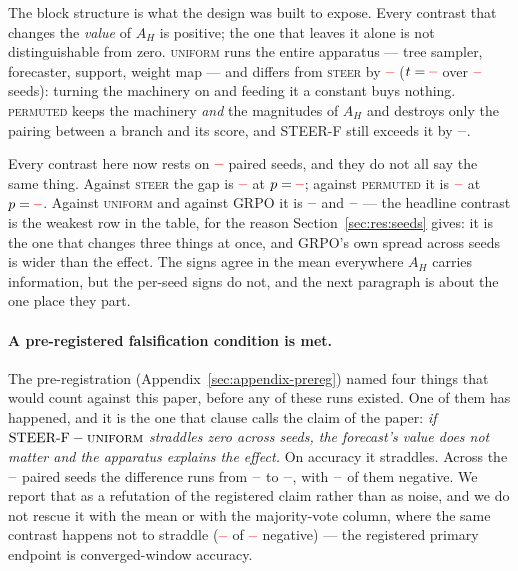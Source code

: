 \documentclass[11pt]{article}
\newcommand{\AH}{A_{H}}
\providecommand{\PENDING}{\textcolor{red}{\textbf{--}}}
\newcommand{\num}[1]{\ifcsname #1\endcsname\csname #1\endcsname\else\PENDING\fi}
\begin{document}
The block structure is what the design was built to expose. Every contrast that
changes the \emph{value} of $\AH$ is positive; the one that leaves it alone is not
distinguishable from zero. \textsc{uniform} runs the entire apparatus --- tree
sampler, forecaster, support, weight map --- and differs from \textsc{steer} by
$\num{Cuniformsteeracc}$ ($t = \num{Tuniformsteeracc}$ over
$\num{Nseedsused}$ seeds): turning the machinery on and feeding it a constant
buys nothing. \textsc{permuted} keeps the machinery \emph{and} the magnitudes of
$\AH$ and destroys only the pairing between a branch and its score, and STEER-F
still exceeds it by $\num{Csignedpermutedacc}$.

Every contrast here now rests on $\num{Nsignedgrpo}$ paired seeds, and they do not
all say the same thing. Against \textsc{steer} the gap is $\num{Csignedsteeracc}$ at
$p = \num{Psignedsteeracc}$; against \textsc{permuted} it is
$\num{Csignedpermutedacc}$ at $p = \num{Psignedpermutedacc}$. Against
\textsc{uniform} and against GRPO it is $\num{Psigneduniformacc}$ and
$\num{Psignedgrpoacc}$ --- the headline contrast is the weakest row in the table, for
the reason Section~\ref{sec:res:seeds} gives: it is the one that changes three things
at once, and GRPO's own spread across seeds is wider than the effect. The signs agree
in the mean everywhere $\AH$ carries information, but the per-seed signs do not, and
the next paragraph is about the one place they part.

\paragraph{A pre-registered falsification condition is met.} The pre-registration
(Appendix~\ref{sec:appendix-prereg}) named four things that would count against this
paper, before any of these runs existed. One of them has happened, and it is the one
that clause calls the claim of the paper: \emph{if
$\text{STEER-F} - \textsc{uniform}$ straddles zero across seeds, the forecast's value
does not matter and the apparatus explains the effect.} On accuracy it straddles.
Across the $\num{Nsigneduniform}$ paired seeds the difference runs from
$\num{CLosigneduniformacc}$ to $\num{CHisigneduniformacc}$, with
$\num{CNegsigneduniformacc}$ of them negative. We report that as a refutation of the
registered claim rather than as noise, and we do not rescue it with the mean or with
the majority-vote column, where the same contrast happens not to straddle
($\num{CNegsigneduniformmaj}$ of $\num{Nsigneduniform}$ negative) --- the registered
primary endpoint is converged-window accuracy.
\end{document}
